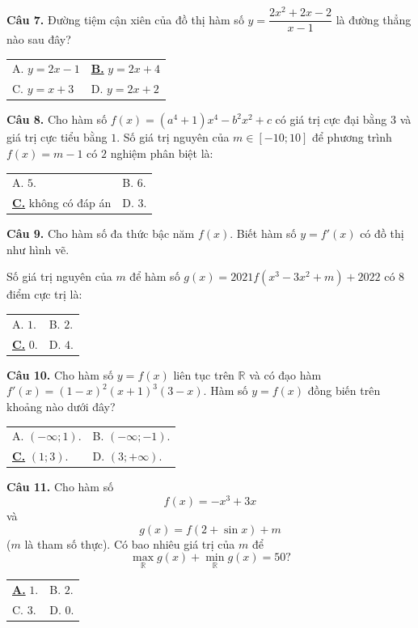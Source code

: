 \documentclass[12pt,a4paper]{article}
\makeatletter
\newcommand{\choiceA}[4]{
    \par\vspace{0.5em}\noindent
    \begin{tabularx}{\textwidth}{@{}X X@{}}
    \underline{\textbf{A.}} #1 & B. #2 \\[
1.2em]
    C. #3 & D. #4
    \end{tabularx}
}
\newcommand{\choiceB}[4]{
    \par\vspace{0.5em}\noindent
    \begin{tabularx}{\textwidth}{@{}X X@{}}
    A. #1 & \underline{\textbf{B.}} #2 \\[1.2em]
    C. #3 & D. #4
    \end{tabularx}
}
\newcommand{\choiceC}[4]{
    \par\vspace{0.5em}\noindent
    \begin{tabularx}{\textwidth}{@{}X X@{}}
    A. #1 & B. #2 \\[1.2em]
    \underline{\textbf{C.}} #3 & D. #4
    \end{tabularx}
}
\makeatother
\begin{document}
\textbf{Câu 7.} Đường tiệm cận xiên của đồ thị hàm số $y = \dfrac{2x^2 + 2x - 2}{x - 1}$ là đường thẳng nào sau đây?
\begin{center}
\end{center}
\choiceB{$y = 2x - 1$}{$y = 2x + 4$}{$y = x + 3$}{$y = 2x + 2$}
\textbf{Câu 8.} Cho hàm số $f(x) = (a^4+1)x^4 - b^2x^2 + c$ có giá trị cực đại bằng $3$ và giá trị cực tiểu bằng $1$. Số giá trị nguyên của $m \in [-10; 10]$ để phương trình $f(x) = m-1$ có $2$ nghiệm phân biệt là:
\choiceC{$5$.}{$6$.}{không có đáp án}{$3$.}
\textbf{Câu 9.} Cho hàm số đa thức bậc năm $f(x)$. Biết hàm số $y = f'(x)$ có đồ thị như hình vẽ.
\begin{center}
\end{center}
Số giá trị nguyên của $m$ để hàm số $g(x) = 2021f(x^3 - 3x^2 + m) + 2022$ có $8$ điểm cực trị là:
\choiceC{$1$.}{$2$.}{$0$.}{$4$.}
\textbf{Câu 10.} Cho hàm số $y=f(x)$ liên tục trên $\mathbb{R}$ và có đạo hàm $f'(x)=(1-x)^2(x+1)^3(3-x)$. Hàm số $y=f(x)$ đồng biến trên khoảng nào dưới đây?
\choiceC{$(-\infty; 1)$.}{$(-\infty; -1)$.}{$(1; 3)$.}{$(3; +\infty)$.}
\textbf{Câu 11.} Cho hàm số
\[
f(x) = -x^3 + 3x
\]
và
\[
g(x) = f(2 + \sin x) + m
\]
($m$ là tham số thực). Có bao nhiêu giá trị của $m$ để
\[
\max_{\mathbb{R}} g(x) + \min_{\mathbb{R}} g(x) = 50?
\]
\choiceA{$1$.}{$2$.}{$3$.}{$0$.}
\end{document}
